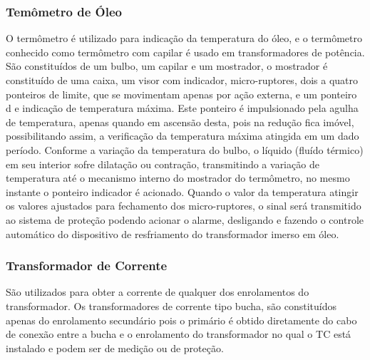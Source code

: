 \documentclass[a5paper,english,spanish,brazil]{ufsc-thesis}
\begin{document}
		\subsubsection{Temômetro de Óleo}
		O termômetro é utilizado para indicação da temperatura do óleo, e o termômetro conhecido como termômetro com capilar é usado em transformadores de potência. São constituídos de um bulbo, um capilar e um mostrador, o mostrador é constituído de uma caixa, um visor com indicador, micro-ruptores, dois a quatro ponteiros de limite, que se movimentam apenas por ação externa, e um ponteiro d e indicação de temperatura máxima. Este ponteiro é impulsionado pela agulha de temperatura, apenas quando em ascensão desta, pois na redução fica imóvel, possibilitando assim, a verificação da temperatura máxima atingida em um dado período. Conforme a variação da temperatura do bulbo, o líquido (fluído térmico) em seu interior sofre dilatação ou contração, transmitindo a variação de temperatura até o mecanismo interno do mostrador do termômetro, no mesmo instante o ponteiro indicador é acionado. Quando o valor da temperatura atingir os valores ajustados para fechamento dos micro-ruptores, o sinal será transmitido ao sistema de proteção podendo acionar o alarme, desligando e fazendo o controle automático do dispositivo de resfriamento do transformador imerso em óleo.

		\subsubsection{Transformador de Corrente}
		São utilizados para obter a corrente de qualquer dos enrolamentos do transformador. Os transformadores de corrente tipo bucha, são constituídos apenas do enrolamento secundário pois o primário é obtido diretamente do cabo de conexão entre a bucha e o enrolamento do transformador no qual o TC está instalado e podem ser de medição ou de proteção.
\end{document}
